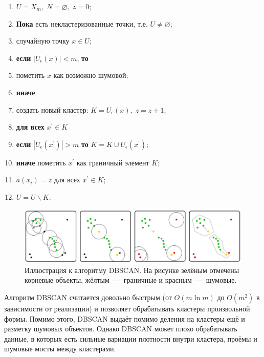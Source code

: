 \documentclass[article, 10pt]{disser}
\begin{document}
\begin{enumerate}
       \item $U = X_m,\; N = \varnothing,\; z = 0$;
       \item \textbf{Пока} есть некластеризованные точки, т.е. $U \neq \varnothing$;
       \item {} случайную точку $x \in U$;
       \item \quad\textbf{если} $|U_{\epsilon}(x)| < m$, \textbf{то}
       \item \quad\quad пометить $x$ как возможно шумовой;
       \item \quad\textbf{иначе}
       \item \quad\quad создать новый кластер: $K = U_{\epsilon}(x),\; z = z + 1$;
       \item \quad\quad\textbf{для всех} $x^{'} \in K$
       \item \quad\quad\quad\textbf{если} $|U_{\epsilon}(x^{'})| > m$ \textbf{то} $K = K \cup U_{\epsilon}(x^{'})$;
       \item \quad\quad\quad\textbf{иначе} пометить $x^{'}$ как граничный элемент $K$;
       \item \quad\quad$a(x_i) = z$ для всех $x^{'} \in K$;
       \item \quad\quad$U = U\backslash K$.
   \end{enumerate}
   
\begin{figure}
   \begin{center}
   \includegraphics[scale = 0.4]{DBSCAN.png}
   \caption{Иллюстрация к алгоритму DBSCAN. На рисунке зелёным отмечены корневые объекты, жёлтым~---~граничные и красным~---~шумовые.}
   \end{center}
   \end{figure}
Алгоритм DBSCAN считается довольно быстрым (от $O(m \ln m)$ до $O(m^2)$ в зависимости от реализации) и позволяет обрабатывать кластеры произвольной формы. Помимо этого, DBSCAN выдаёт помимо деления на кластеры ещё и разметку шумовых объектов. Однако DBSCAN может плохо обрабатывать данные, в которых есть сильные вариации плотности внутри кластера, проёмы и шумовые мосты между кластерами.
\end{document}
